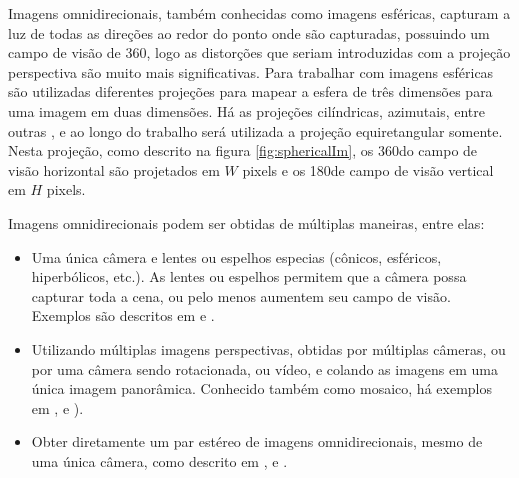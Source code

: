 \documentclass[cic,tc]{iiufrgs}
\begin{document}
\begin{figure}
\begin{center}
{
	}
    \end{center}
    \label{fig:perspectiveProj}
\end{figure}

Imagens omnidirecionais, também conhecidas como imagens esféricas, capturam a luz de todas as direções ao redor do ponto onde são capturadas, possuindo um campo de visão de 360\degree, logo as distorções que seriam introduzidas com a projeção perspectiva são muito mais significativas. Para trabalhar com imagens esféricas são utilizadas diferentes projeções para mapear a esfera de três dimensões para uma imagem em duas dimensões. Há as projeções cilíndricas, azimutais, entre outras , e ao longo do trabalho será utilizada a projeção equiretangular somente. Nesta projeção,  como descrito na figura \ref{fig:sphericalIm}, os 360\degree do campo de visão horizontal são projetados em $W$ pixels e os 180\degree de campo de visão vertical em $H$ pixels.

Imagens omnidirecionais podem ser obtidas de múltiplas maneiras, entre elas:
\begin{itemize}
\item Uma única câmera e lentes ou espelhos especias (cônicos, esféricos, hiperbólicos, etc.). As lentes ou espelhos permitem que a câmera possa capturar toda a cena, ou pelo menos aumentem seu campo de visão. Exemplos são descritos em \citet{omniSingleCam1997} e \citet{omniSingleCam1998}.
\item Utilizando múltiplas imagens perspectivas, obtidas por múltiplas câmeras, ou por uma câmera sendo rotacionada, ou vídeo, e colando as imagens em uma única imagem panorâmica. Conhecido também como mosaico, há exemplos em \citet{omniMultiCam1994}, \citet{omniMultiCam1996} e \citet{omniMultiCam1997}).
\item Obter diretamente um par estéreo de imagens omnidirecionais, mesmo de uma única câmera, como descrito em \citet{omniStereoCam1999}, \citep{omniStereoCam2013} e \citet{omniStereoCam2016}.
\end{itemize}
\end{document}

